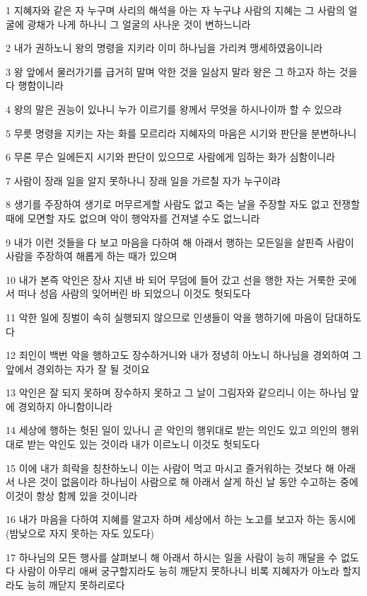 \par 1 지혜자와 같은 자 누구며 사리의 해석을 아는 자 누구냐 사람의 지혜는 그 사람의 얼굴에 광채가 나게 하나니 그 얼굴의 사나운 것이 변하느니라
\par 2 내가 권하노니 왕의 명령을 지키라 이미 하나님을 가리켜 맹세하였음이니라
\par 3 왕 앞에서 물러가기를 급거히 말며 악한 것을 일삼지 말라 왕은 그 하고자 하는 것을 다 행함이니라
\par 4 왕의 말은 권능이 있나니 누가 이르기를 왕께서 무엇을 하시나이까 할 수 있으랴
\par 5 무릇 명령을 지키는 자는 화를 모르리라 지혜자의 마음은 시기와 판단을 분변하나니
\par 6 무론 무슨 일에든지 시기와 판단이 있으므로 사람에게 임하는 화가 심함이니라
\par 7 사람이 장래 일을 알지 못하나니 장래 일을 가르칠 자가 누구이랴
\par 8 생기를 주장하여 생기로 머무르게할 사람도 없고 죽는 날을 주장할 자도 없고 전쟁할 때에 모면할 자도 없으며 악이 행악자를 건져낼 수도 없느니라
\par 9 내가 이런 것들을 다 보고 마음을 다하여 해 아래서 행하는 모든일을 살핀즉 사람이 사람을 주장하여 해롭게 하는 때가 있으며
\par 10 내가 본즉 악인은 장사 지낸 바 되어 무덤에 들어 갔고 선을 행한 자는 거룩한 곳에서 떠나 성읍 사람의 잊어버린 바 되었으니 이것도 헛되도다
\par 11 악한 일에 징벌이 속히 실행되지 않으므로 인생들이 악을 행하기에 마음이 담대하도다
\par 12 죄인이 백번 악을 행하고도 장수하거니와 내가 정녕히 아노니 하나님을 경외하여 그 앞에서 경외하는 자가 잘 될 것이요
\par 13 악인은 잘 되지 못하며 장수하지 못하고 그 날이 그림자와 같으리니 이는 하나님 앞에 경외하지 아니함이니라
\par 14 세상에 행하는 헛된 일이 있나니 곧 악인의 행위대로 받는 의인도 있고 의인의 행위대로 받는 악인도 있는 것이라 내가 이르노니 이것도 헛되도다
\par 15 이에 내가 희락을 칭찬하노니 이는 사람이 먹고 마시고 즐거워하는 것보다 해 아래서 나은 것이 없음이라 하나님이 사람으로 해 아래서 살게 하신 날 동안 수고하는 중에 이것이 항상 함께 있을 것이니라
\par 16 내가 마음을 다하여 지혜를 알고자 하며 세상에서 하는 노고를 보고자 하는 동시에(밤낮으로 자지 못하는 자도 있도다)
\par 17 하나님의 모든 행사를 살펴보니 해 아래서 하시는 일을 사람이 능히 깨달을 수 없도다 사람이 아무리 애써 궁구할지라도 능히 깨닫지 못하나니 비록 지혜자가 아노라 할지라도 능히 깨닫지 못하리로다

